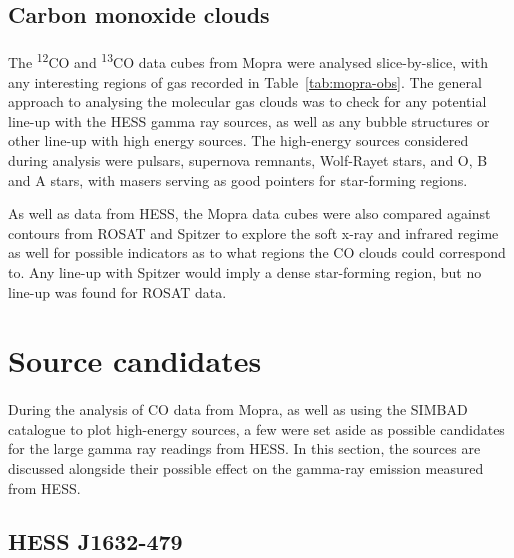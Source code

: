 \documentclass[a4paper, titlepage, oneside]{article}
\newcommand{\elem}[2]{\textsuperscript{#1}{#2}}
\begin{document}
\begin{multicols}{2}
\subsection{Carbon monoxide clouds}
\paragraph{}
The \elem{12}{C}O and \elem{13}{C}O data cubes from Mopra were analysed slice-by-slice, with any interesting regions of gas recorded in Table~\ref{tab:mopra-obs}. The general approach to analysing the molecular gas clouds was to check for any potential line-up with the HESS gamma ray sources, as well as any bubble structures or other line-up with high energy sources. The high-energy sources considered during analysis were pulsars, supernova remnants, Wolf-Rayet stars, and O, B and A stars, with masers serving as good pointers for star-forming regions.

As well as data from HESS, the Mopra data cubes were also compared against contours from ROSAT and Spitzer to explore the soft x-ray and infrared regime as well for possible indicators as to what regions the CO clouds could correspond to. Any line-up with Spitzer would imply a dense star-forming region, but no line-up was found for ROSAT data.

\section{Source candidates} %
\paragraph{}
During the analysis of CO data from Mopra, as well as using the SIMBAD catalogue to plot high-energy sources, a few were set aside as possible candidates for the large gamma ray readings from HESS. In this section, the sources are discussed alongside their possible effect on the gamma-ray emission measured from HESS.

\subsection{HESS J1632-479}


\end{multicols}
\end{document}
